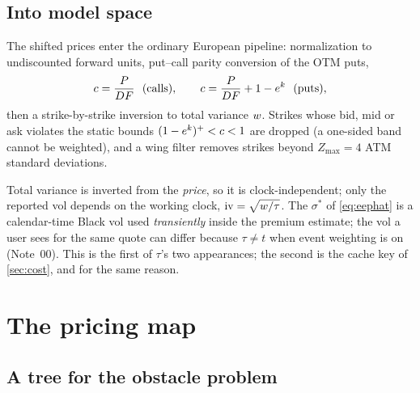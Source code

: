 \documentclass[11pt]{article}
\begin{document}
\subsection{Into model space}

The shifted prices enter the ordinary European pipeline: normalization to
undiscounted forward units, put--call parity conversion of the OTM puts,
\begin{equation}
c=\frac{P}{D\fwd}\ \ \text{(calls)},\qquad
c=\frac{P}{D\fwd}+1-e^{\logm}\ \ \text{(puts)},
\label{eq:parity}
\end{equation}
then a strike-by-strike inversion to total variance $w$.  Strikes whose
bid, mid or ask violates the static bounds $(1-e^{k})^+<c<1$ are
dropped (a one-sided band cannot be weighted), and a wing filter removes
strikes beyond $Z_{\max}=4$ ATM standard deviations.

\begin{remark}
\label{rem:clocks}
Total variance is inverted from the \emph{price}, so it is
clock-independent; only the reported vol depends on the working clock,
$\mathrm{iv}=\sqrt{w/\tau}$.  The $\sigma^*$ of \cref{eq:eephat} is a
calendar-time Black vol used \emph{transiently} inside the premium
estimate; the vol a user sees for the same quote can differ because
$\tau\ne t$ when event weighting is on (Note~00).  This is the first of
$\tau$'s two appearances; the second is the cache key of \cref{sec:cost},
and for the same reason.
\end{remark}

\section{The pricing map}
\label{sec:tree}

\subsection{A tree for the obstacle problem}
\end{document}
